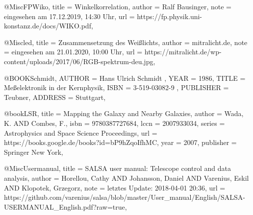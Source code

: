 
@Misc{FPWiko,
title = {Winkelkorrelation},
author = {Ralf Bausinger},
note = {eingesehen am 17.12.2019, 14:30 Uhr},
url = {https://fp.physik.uni-konstanz.de/docs/WIKO.pdf},
}


@Misc{led,
title = {Zusammensetzung des Weißlichts},
author = {mitralicht.de},
note = {eingesehen am 21.01.2020, 10:00 Uhr},
url = {https://mitralicht.de/wp-content/uploads/2017/06/RGB-spektrum-deu.jpg},
}

@BOOK{Schmidt,
	AUTHOR = {Hans Ulrich Schmidt },
	YEAR = {1986},
	TITLE = {Meßelektronik in der Kernphysik},
	ISBN = {3-519-03082-9 },
	PUBLISHER = {Teubner},
	ADDRESS = {Stuttgart},
}

@book{LSR,
  title = {Mapping the Galaxy and Nearby Galaxies},
  author = {{Wada, K.} AND {Combes, F.}},
  isbn = {9780387727684},
  lccn = {2007933034},
  series = {Astrophysics and Space Science Proceedings},
  url = {https://books.google.de/books?id=bP9hZqoIfhMC},
  year = {2007},
  publisher = {Springer New York},
}

@Misc{Usermanual,
title = {SALSA user manual: Telescope control and data analysis},
author = {{Horellou, Cathy} AND {Johansson, Daniel} AND {Varenius, Eskil} AND {Klopotek, Grzegorz}},
note = {letztes Update: 2018-04-01 20:36},
url = {https://github.com/varenius/salsa/blob/master/User_manual/English/SALSA-USERMANUAL_English.pdf?raw=true},
}